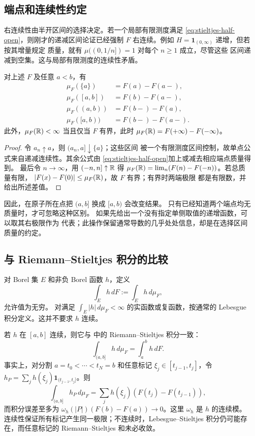 \subsection{端点和连续性约定}

右连续性由半开区间的选择决定。若一个局部有限测度满足
\eqref{eq:stieltjes-half-open}，则刚才的递减区间论证已经强制 \(F\)
右连续。例如 \(H=\mathbf1_{(0,\infty)}\) 递增，但若按其增量规定
质量，就有 \(\mu((0,1/n])=1\) 对每个 \(n\ge1\) 成立，尽管这些
区间递减到空集。这与局部有限测度的连续性矛盾。

\begin{proposition}\label{prop:stieltjes-endpoints}
对上述 \(F\) 及任意 \(a<b\)，有
\[
 \begin{aligned}
 \mu_F(\{a\})&=F(a)-F(a-),\\
 \mu_F([a,b])&=F(b)-F(a-),\\
 \mu_F((a,b))&=F(b-)-F(a),\\
 \mu_F([a,b))&=F(b-)-F(a-).
 \end{aligned}
\]
此外，\(\mu_F(\mathbb{R})<\infty\) 当且仅当 \(F\) 有界，此时
\(\mu_F(\mathbb{R})=F(+\infty)-F(-\infty)\)。
\end{proposition}
\begin{proof}
令 \(a_n\uparrow a\)，则 \((a_n,a]\downarrow\{a\}\)；这些区间
被一个有限测度区间控制，故单点公式来自递减连续性。其余公式由
\eqref{eq:stieltjes-half-open}加上或减去相应端点质量得到。
最后令 \(n\to\infty\)，用 \((-n,n]\uparrow\mathbb{R}\) 得
\(\mu_F(\mathbb{R})=\lim_n(F(n)-F(-n))\)。若总质量有限，
\(|F(x)-F(0)|\le\mu_F(\mathbb{R})\)，故 \(F\) 有界；有界时两端极限
都是有限数，并给出所述差值。
\end{proof}

因此，在原子所在点把 \((a,b]\) 换成 \([a,b)\) 会改变结果。
只有已经知道两个端点均无质量时，才可忽略这种区别。
如果先给出一个没有指定单侧取值的递增函数，可以取其右极限作为
代表；此操作保留通常导数的几乎处处信息，却是在选择区间质量的约定。

\subsection{与 Riemann--Stieltjes 积分的比较}

对 Borel 集 \(E\) 和非负 Borel 函数 \(h\)，定义
\[
 \int_Eh\,dF:=\int_Eh\,d\mu_F,
\]
允许值为无穷。
对满足 \(\int_E|h|\,d\mu_F<\infty\) 的实函数或复函数，按通常的
Lebesgue 积分定义。这并不要求 \(h\) 连续。

若 \(h\) 在 \([a,b]\) 连续，则它与
中的 Riemann--Stieltjes 积分一致：
\begin{equation}\label{eq:stieltjes-rs-compatibility}
 \int_{(a,b]}h\,d\mu_F=\int_a^bh\,dF.
\end{equation}
事实上，对分割 \(a=t_0<\cdots<t_N=b\) 和任意标记
\(\xi_j\in[t_{j-1},t_j]\)，令
\(h_P=\sum_jh(\xi_j)\mathbf1_{(t_{j-1},t_j]}\)。则
\[
 \int_{(a,b]}h_P\,d\mu_F
 =\sum_jh(\xi_j)(F(t_j)-F(t_{j-1})),
\]
而积分误差至多为
\(\omega_h(|P|)(F(b)-F(a))\to0\)。这里 \(\omega_h\) 是 \(h\)
的连续模。连续性保证所有标记产生同一极限；不连续时，Lebesgue--Stieltjes
积分仍可能存在，而任意标记的 Riemann--Stieltjes 和未必收敛。

